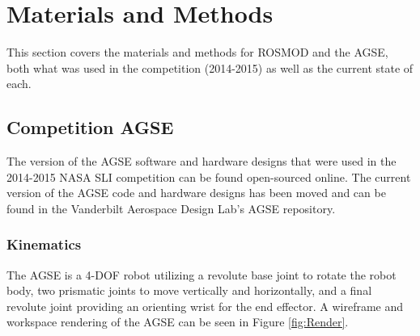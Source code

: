 \section{Materials and Methods}
%

This section covers the materials and methods for ROSMOD and the AGSE,
both what was used in the competition (2014-2015) as well as the
current state of each.

\subsection{Competition AGSE}

The version of the AGSE software and hardware designs that were used
in the 2014-2015 NASA SLI competition can be found open-sourced
online\cite{AGSE2015}. The current version of the AGSE code and
hardware designs has been moved and can be found in the Vanderbilt
Aerospace Design Lab's AGSE repository\cite{AGSE}.

\subsubsection{Kinematics}

The AGSE is a 4-DOF robot utilizing a revolute base joint to rotate
the robot body, two prismatic joints to move vertically and
horizontally, and a final revolute joint providing an orienting wrist
for the end effector. A wireframe and workspace rendering of the AGSE
can be seen in Figure \ref{fig:Render}.


